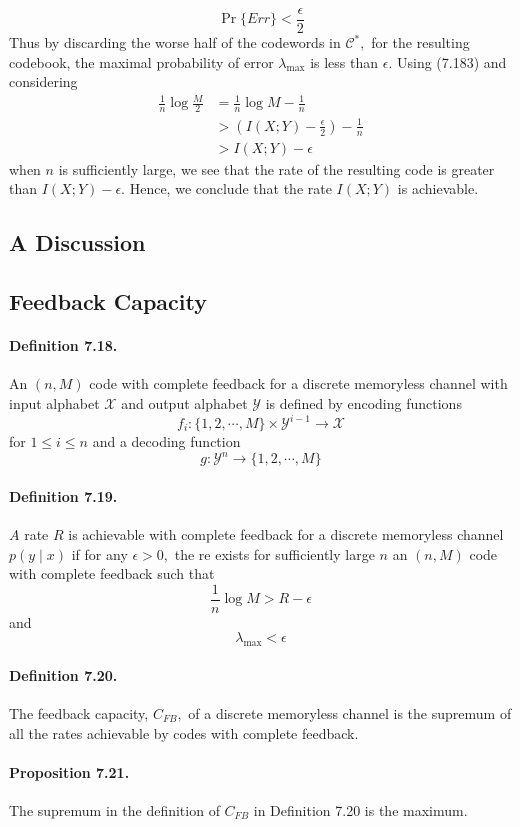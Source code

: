 \documentclass[8pt]{article}
\begin{document}
$$
\operatorname{Pr}\{E r r\}<\frac{\epsilon}{2}
$$
Thus by discarding the worse half of the codewords in $\mathcal{C}^{*},$ for the resulting codebook, the maximal probability of error $\lambda_{\max }$ is less than $\epsilon .$ Using (7.183) and considering
$$
\begin{aligned}
\frac{1}{n} \log \frac{M}{2} &=\frac{1}{n} \log M-\frac{1}{n} \\
&>\left(I(X ; Y)-\frac{\epsilon}{2}\right)-\frac{1}{n} \\
&>I(X ; Y)-\epsilon
\end{aligned}
$$
when $n$ is sufficiently large, we see that the rate of the resulting code is greater than $I(X ; Y)-\epsilon .$ Hence, we conclude that the rate $I(X ; Y)$ is achievable.

\subsection{A Discussion}
\subsection{Feedback Capacity}

\begin{tcolorbox}
\paragraph{Definition 7.18.} An $(n, M)$ code with complete feedback for a discrete memoryless channel with input alphabet $\mathcal{X}$ and output alphabet $\mathcal{Y}$ is defined by encoding functions
$$
f_{i}:\{1,2, \cdots, M\} \times \mathcal{Y}^{i-1} \rightarrow \mathcal{X}
$$
for $1 \leq i \leq n$ and a decoding function
$$
g: \mathcal{Y}^{n} \rightarrow\{1,2, \cdots, M\}
$$
\end{tcolorbox}
\begin{tcolorbox}
\paragraph{Definition 7.19.} $A$ rate $R$ is achievable with complete feedback for a discrete memoryless channel $p(y \mid x)$ if for any $\epsilon>0,$ the re exists for sufficiently large $n$ an $(n, M)$ code with complete feedback such that
$$
\frac{1}{n} \log M>R-\epsilon
$$
and
$$
\lambda_{\max }<\epsilon
$$
\end{tcolorbox}
\begin{tcolorbox}
\paragraph{Definition 7.20.} The feedback capacity, $C_{F B},$ of a discrete memoryless channel is the supremum of all the rates achievable by codes with complete feedback.\\

\paragraph{Proposition 7.21.} The supremum in the definition of $C_{F B}$ in Definition 7.20 is the maximum.
\end{tcolorbox}
\end{document}
